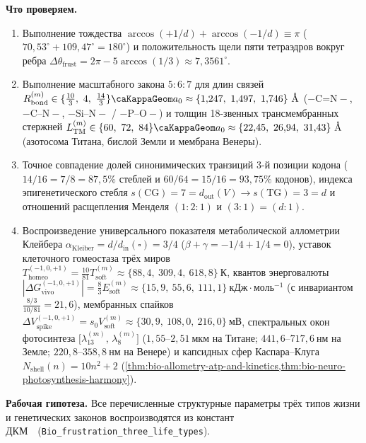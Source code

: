 \textbf{Что проверяем.}
\begin{enumerate}[label=\textbf{(\alph*)},leftmargin=*,itemsep=0.25em]
\item Выполнение тождества $\arccos(+1/d)+\arccos(-1/d) \equiv \pi$ ($70{,}53^\circ + 109{,}47^\circ = 180^\circ$) и положительность щели пяти тетраэдров вокруг ребра $\Delta\theta_{\mathrm{frust}} = 2\pi - 5\arccos(1/3) \approx 7{,}3561^\circ$.
\item Выполнение масштабного закона $5:6:7$ для длин связей $R_{\mathrm{bond}}^{(m)} \in \{\frac{10}{3},\ 4,\ \frac{14}{3}\}\caKappaGeom a_0 \approx \{1{,}247,\ 1{,}497,\ 1{,}746\}\ \text{\normalfont\AA}$ ($-\text{C{=}N}-$, $-\text{C--N}-$, $-\text{Si--N}-$ / $-\text{P--O}-$) и толщин 18-звенных трансмембранных стержней $L_{\mathrm{TM}}^{(m)} \in \{60,\ 72,\ 84\}\caKappaGeom a_0 \approx \{22{,}45,\ 26{,}94,\ 31{,}43\}\ \text{\normalfont\AA}$ (азотосома Титана, бислой Земли и мембрана Венеры).
\item Точное совпадение долей синонимических транзиций 3-й позиции кодона ($14/16 = 7/8 = 87{,}5\%$ стеблей и $60/64 = 15/16 = 93{,}75\%$ кодонов), индекса эпигенетического стебля $s(\text{CG}) = 7 = d_{\mathrm{out}}(V) \to s(\text{TG}) = 3 = d$ и отношений расщепления Менделя $(1:2:1)$ и $(3:1) = (d:1)$.
\item Воспроизведение универсального показателя метаболической аллометрии Клейбера $\alpha_{\mathrm{Kleiber}} = d/d_{\mathrm{in}}(\square) = 3/4$ ($\beta + \gamma = -1/4 + 1/4 = 0$), уставок клеточного гомеостаза трёх миров $T_{\mathrm{homeo}}^{(-1,0,+1)} = \frac{10}{81}T_{\mathrm{soft}}^{(m)} \approx \{88{,}4,\ 309{,}4,\ 618{,}8\}\ \text{К}$, квантов энерговалюты $|\Delta G_{\mathrm{vivo}}^{(-1,0,+1)}| = \frac{8}{3}E_{\mathrm{soft}}^{(m)} \approx \{15{,}9,\ 55{,}6,\ 111{,}1\}\ \text{кДж}\cdot\text{моль}^{-1}$ (с инвариантом $\frac{8/3}{10/81} = 21{,}6$), мембранных спайков $\Delta V_{\mathrm{spike}}^{(-1,0,+1)} = s_0 V_{\mathrm{soft}}^{(m)} \approx \{30{,}9,\ 108{,}0,\ 216{,}0\}\ \text{мВ}$, спектральных окон фотосинтеза $\bigl[\lambda_{13}^{(m)},\, \lambda_8^{(m)}\bigr]$ ($1{,}55\text{--}2{,}51\ \text{мкм}$ на Титане; $441{,}6\text{--}717{,}6\ \text{нм}$ на Земле; $220{,}8\text{--}358{,}8\ \text{нм}$ на Венере) и капсидных сфер Каспара--Клуга $N_{\mathrm{shell}}(n) = 10n^2+2$ (\cref{thm:bio-allometry-atp-and-kinetics,thm:bio-neuro-photosynthesis-harmony}).
\end{enumerate}

{\sloppy\textbf{Рабочая гипотеза.}
Все перечисленные структурные параметры трёх типов жизни и генетических законов воспроизводятся из констант ДКМ~\latGCKshort\ (\texttt{Bio\_frustration\_three\_life\_types}).\par}

